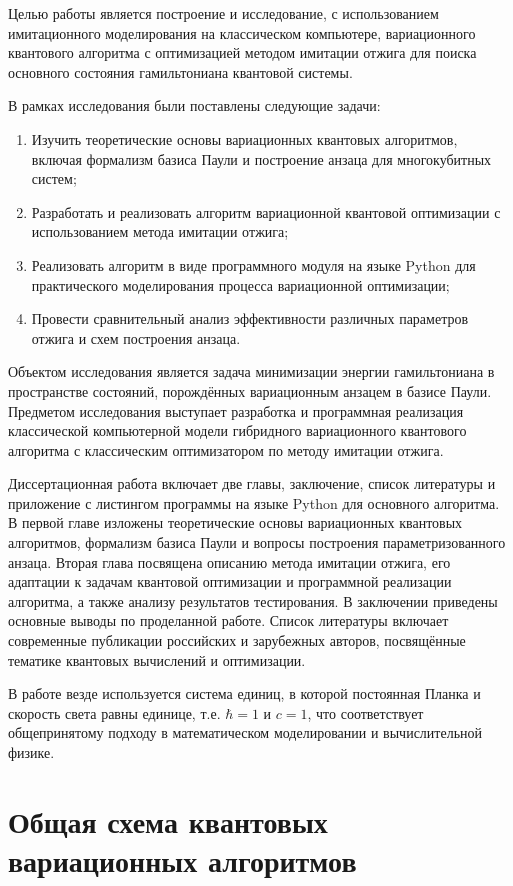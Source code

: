 \documentclass[a4paper]{report}
\begin{document}
Целью работы является построение и исследование, с использованием имитационного моделирования на классическом компьютере, вариационного квантового алгоритма с оптимизацией методом имитации отжига для поиска основного состояния гамильтониана квантовой системы.

В рамках исследования были поставлены следующие задачи:
\begin{enumerate}
    \item Изучить теоретические основы вариационных квантовых алгоритмов, включая формализм базиса Паули и построение анзаца для многокубитных систем;
    \item Разработать и реализовать алгоритм вариационной квантовой оптимизации с использованием метода имитации отжига;
    \item Реализовать алгоритм в виде программного модуля на языке Python для практического моделирования процесса вариационной оптимизации;
    \item Провести сравнительный анализ эффективности различных параметров отжига и схем построения анзаца.
\end{enumerate}

Объектом исследования является задача минимизации энергии гамильтониана в пространстве состояний, порождённых вариационным анзацем в базисе Паули. Предметом исследования выступает разработка и программная реализация классической компьютерной модели гибридного вариационного квантового алгоритма с классическим оптимизатором по методу имитации отжига.

Диссертационная работа включает две главы, заключение, список литературы и приложение с листингом программы на языке Python для основного алгоритма. В первой главе изложены теоретические основы вариационных квантовых алгоритмов, формализм базиса Паули и вопросы построения параметризованного анзаца. Вторая глава посвящена описанию метода имитации отжига, его адаптации к задачам квантовой оптимизации и программной реализации алгоритма, а также анализу результатов тестирования. В заключении приведены основные выводы по проделанной работе. Список литературы включает современные публикации российских и зарубежных авторов, посвящённые тематике квантовых вычислений и оптимизации.

В работе везде используется система единиц, в которой постоянная Планка и скорость света равны единице, т.е. $\hbar=1$ и $c=1$, что соответствует общепринятому подходу в математическом моделировании и вычислительной физике.


\chapter{Общая схема квантовых вариационных алгоритмов}
\end{document}
